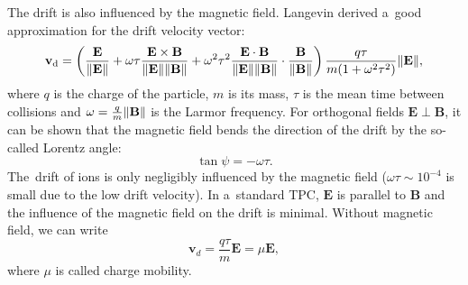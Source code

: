 			The drift is also influenced by the magnetic field. Langevin derived a~good approximation for the drift velocity vector:
				\begin{equation}
					\label{eq:drift}
					\mathbf{v}_\text{d} = \left(\frac{\mathbf{E}}{\norm{\mathbf{E}}} + \omega\tau\frac{\mathbf{E}\times\mathbf{B}}{\norm{\mathbf{E}}\norm{\mathbf{B}}} + \omega^2\tau^2\frac{\mathbf{E}\cdot\mathbf{B}}{\norm{\mathbf{E}}\norm{\mathbf{B}}}\cdot \frac{\mathbf{B}}{\norm{\mathbf{B}}}\right) \frac{q\tau}{m(1+\omega^2\tau^2)}\norm{\mathbf{E}},
				\end{equation}
			where $q$ is the charge of the particle, $m$ is its mass, $\tau$ is the mean time between collisions and $\omega = \frac{q}{m}\norm{\mathbf{B}}$ is the Larmor frequency. For orthogonal fields $\mathbf{E}\perp\mathbf{B}$, it can be shown that the magnetic field bends the direction of the drift by the so\nobreakdash-called Lorentz angle:
				\begin{equation}
					\label{eq:lorentz}
					\tan\psi = -\omega\tau.
				\end{equation}
			The~drift of ions is only negligibly influenced by the magnetic field ($\omega\tau\sim10^{-4}$ is small due to the low drift velocity). In a~standard \ac{TPC}, $\mathbf{E}$ is parallel to $\mathbf{B}$ and the influence of the magnetic field on the drift is minimal. Without magnetic field, we can write
				\begin{equation}
					\mathbf{v}_d = \frac{q\tau}{m} \mathbf{E} = \mu \mathbf{E},
				\end{equation}
			where $\mu$ is called charge mobility.
			
